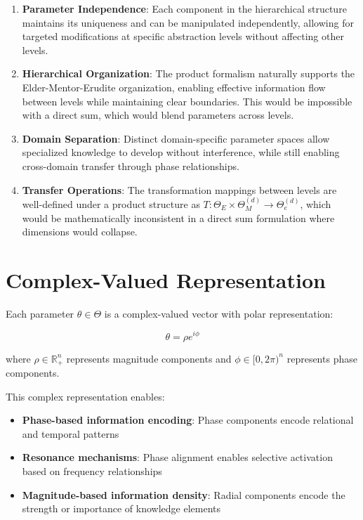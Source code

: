 \begin{definition}
\begin{enumerate}
    \item \textbf{Parameter Independence}: Each component in the hierarchical structure maintains its uniqueness and can be manipulated independently, allowing for targeted modifications at specific abstraction levels without affecting other levels.
    
    \item \textbf{Hierarchical Organization}: The product formalism naturally supports the Elder-Mentor-Erudite organization, enabling effective information flow between levels while maintaining clear boundaries. This would be impossible with a direct sum, which would blend parameters across levels.
    
    \item \textbf{Domain Separation}: Distinct domain-specific parameter spaces allow specialized knowledge to develop without interference, while still enabling cross-domain transfer through phase relationships.
    
    \item \textbf{Transfer Operations}: The transformation mappings between levels are well-defined under a product structure as $T: \Theta_E \times \Theta_M^{(d)} \rightarrow \Theta_e^{(d)}$, which would be mathematically inconsistent in a direct sum formulation where dimensions would collapse.
\end{enumerate}
\end{definition}

\section{Complex-Valued Representation}

\begin{definition}
Each parameter $\theta \in \Theta$ is a complex-valued vector with polar representation:

\begin{equation}
\theta = \rho e^{i\phi}
\end{equation}

where $\rho \in \mathbb{R}^n_+$ represents magnitude components and $\phi \in [0, 2\pi)^n$ represents phase components.
\end{definition}

This complex representation enables:
\begin{itemize}
    \item \textbf{Phase-based information encoding}: Phase components encode relational and temporal patterns
    \item \textbf{Resonance mechanisms}: Phase alignment enables selective activation based on frequency relationships
    \item \textbf{Magnitude-based information density}: Radial components encode the strength or importance of knowledge elements
\end{itemize}

